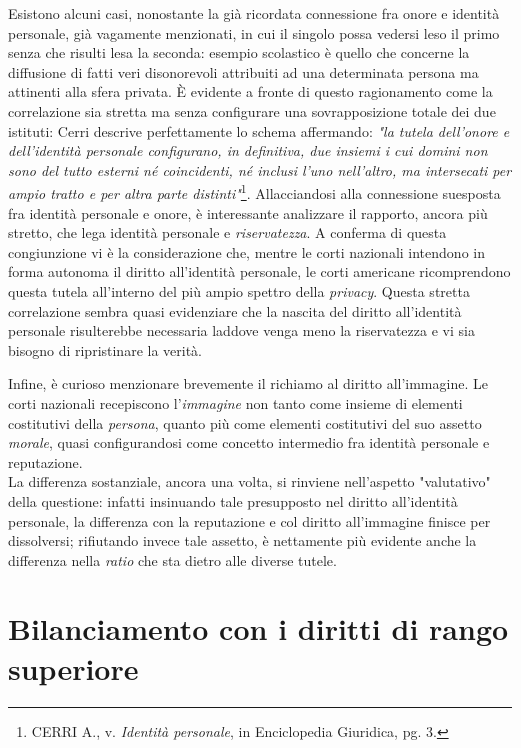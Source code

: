 Esistono alcuni casi, nonostante la già ricordata connessione fra onore e identità personale, già vagamente menzionati, in cui il singolo possa vedersi leso il primo senza che risulti lesa la seconda: esempio scolastico è quello che concerne la diffusione di fatti veri disonorevoli attribuiti ad una determinata persona ma attinenti alla sfera privata.
È evidente a fronte di questo ragionamento come la correlazione sia stretta ma senza configurare una sovrapposizione totale dei due istituti: Cerri descrive perfettamente lo schema affermando:\textit{ "la tutela dell'onore e dell'identità personale configurano, in definitiva, due insiemi i cui domini non sono del tutto esterni né coincidenti, né inclusi l'uno nell'altro, ma intersecati per ampio tratto e per altra parte distinti"}\footnote{CERRI A., v. \textit{Identità personale}, in Enciclopedia Giuridica,  pg. 3.}.
Allacciandosi alla connessione suesposta fra identità personale e onore, è interessante analizzare il rapporto, ancora più stretto, che lega identità personale e \textit{riservatezza}. A conferma di questa congiunzione vi è la considerazione che, mentre le corti nazionali intendono in forma autonoma il diritto all'identità personale, le corti americane ricomprendono questa tutela all'interno del più ampio spettro della \textit{privacy}. Questa stretta correlazione sembra quasi evidenziare che la nascita del diritto all'identità personale risulterebbe necessaria laddove venga meno la riservatezza e vi sia bisogno di ripristinare la verità.

Infine, è curioso menzionare brevemente il richiamo al diritto all'immagine. Le corti nazionali recepiscono l'\textit{immagine} non tanto come insieme di elementi costitutivi della \textit{persona}, quanto più come elementi costitutivi del suo assetto \textit{morale}, quasi configurandosi come concetto intermedio fra identità personale e reputazione. 
\\La differenza sostanziale, ancora una volta, si rinviene nell'aspetto "valutativo" della questione: infatti insinuando tale presupposto nel diritto all'identità personale, la differenza con la reputazione e col diritto all'immagine finisce per dissolversi; rifiutando invece tale assetto, è nettamente più evidente anche la differenza nella \textit{ratio} che sta dietro alle diverse tutele.

\section{Bilanciamento con i diritti di rango superiore} %


